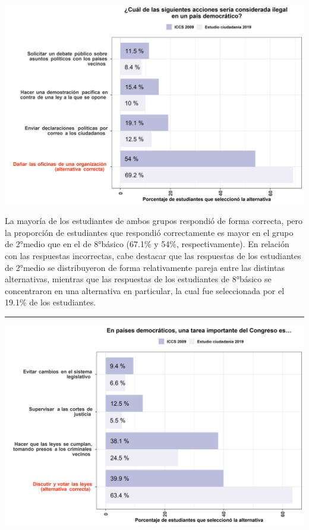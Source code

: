 \documentclass[
  14pt,
]{book}
\let\origfigure\figure
\let\endorigfigure\endfigure
\renewenvironment{figure}[1][2] {
  \expandafter\origfigure\expandafter[H]
} {
  \endorigfigure
}
\begin{document}
\begin{figure}[!ht]

{\centering \includegraphics[width=0.8\linewidth,]{images/graph_p3} 

}

\caption{Comparación con ICCS: Acción ilegal en un país democrático}\label{fig:unnamed-chunk-21}
\end{figure}

La mayoría de los estudiantes de ambos grupos respondió de forma correcta, pero la proporción de estudiantes que respondió correctamente es mayor en el grupo de 2°medio que en el de 8°básico (67.1\% y 54\%, respectivamente). En relación con las respuestas incorrectas, cabe destacar que las respuestas de los estudiantes de 2°medio se distribuyeron de forma relativamente pareja entre las distintas alternativas, mientras que las respuestas de los estudiantes de 8°básico se concentraron en una alternativa en particular, la cual fue seleccionada por el 19.1\% de los estudiantes.

\begin{center}\rule{0.5\linewidth}{0.5pt}\end{center}

\begin{figure}[!ht]

{\centering \includegraphics[width=0.8\linewidth,]{images/graph_p4} 

}

\caption{Comparación con ICCS: Actividad principal del Congreso}\label{fig:unnamed-chunk-22}
\end{figure}
\end{document}
